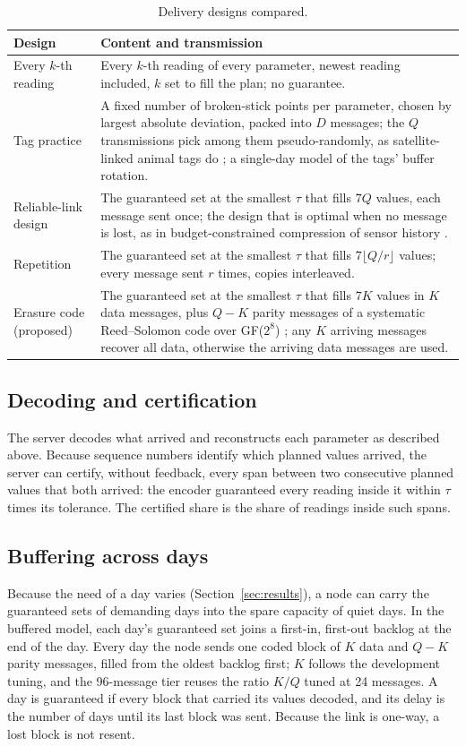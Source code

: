 \begin{table}[t]
\centering
\caption{Delivery designs compared.}
\label{tab:designs}
\small
\begin{tabularx}{\textwidth}{@{}lX@{}}
\toprule
Design & Content and transmission \\
\midrule
Every $k$-th reading & Every $k$-th reading of every parameter, newest reading included, $k$ set to fill the plan; no guarantee. \\
Tag practice & A fixed number of broken-stick points per parameter, chosen by largest absolute deviation, packed into $D$ messages; the $Q$ transmissions pick among them pseudo-randomly, as satellite-linked animal tags do \citep{boehme2009,photopoulou2015}; a single-day model of the tags' buffer rotation. \\
Reliable-link design & The guaranteed set at the smallest $\tau$ that fills $7Q$ values, each message sent once; the design that is optimal when no message is lost, as in budget-constrained compression of sensor history \citep{deligiannakis2007}. \\
Repetition & The guaranteed set at the smallest $\tau$ that fills $7\lfloor Q/r \rfloor$ values; every message sent $r$ times, copies interleaved. \\
Erasure code (proposed) & The guaranteed set at the smallest $\tau$ that fills $7K$ values in $K$ data messages, plus $Q-K$ parity messages of a systematic Reed--Solomon code over GF($2^8$) \citep{reed1960}; any $K$ arriving messages recover all data, otherwise the arriving data messages are used. \\
\bottomrule
\end{tabularx}
\end{table}

\subsection{Decoding and certification}
The server decodes what arrived and reconstructs each parameter as described above. Because sequence numbers identify which planned values arrived, the server can certify, without feedback, every span between two consecutive planned values that both arrived: the encoder guaranteed every reading inside it within $\tau$ times its tolerance. The certified share is the share of readings inside such spans.

\subsection{Buffering across days}
Because the need of a day varies (Section~\ref{sec:results}), a node can carry the guaranteed sets of demanding days into the spare capacity of quiet days. In the buffered model, each day's guaranteed set joins a first-in, first-out backlog at the end of the day. Every day the node sends one coded block of $K$ data and $Q-K$ parity messages, filled from the oldest backlog first; $K$ follows the development tuning, and the 96-message tier reuses the ratio $K/Q$ tuned at 24 messages. A day is guaranteed if every block that carried its values decoded, and its delay is the number of days until its last block was sent. Because the link is one-way, a lost block is not resent.
